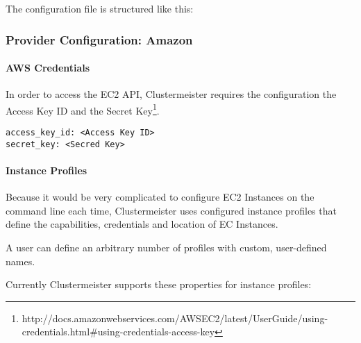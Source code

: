 The configuration file is structured like this:



\subsubsection{Provider Configuration: Amazon}

\paragraph{AWS Credentials}

In order to access the EC2 API, Clustermeister requires the configuration the Access Key ID and the Secret Key\footnote{http://docs.amazonwebservices.com/AWSEC2/latest/UserGuide/using-credentials.html\#using-credentials-access-key}.

\begin{lstlisting}[breaklines=true, frame=single]
access_key_id: <Access Key ID> 
secret_key: <Secred Key>
\end{lstlisting}

\paragraph{Instance Profiles}

Because it would be very complicated to configure EC2 Instances on the command line each time, Clustermeister uses configured instance profiles that define the capabilities, credentials and location of EC Instances.

A user can define an arbitrary number of profiles with custom, user-defined names.

Currently Clustermeister supports these properties for instance profiles:

